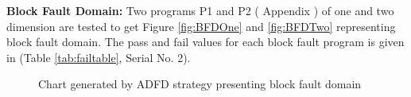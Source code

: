 \documentclass[runningheads,a4paper]{llncs}
\begin{document}


\textbf{Block Fault Domain:} Two programs P1 and P2 ( Appendix ) of one and two dimension are tested to get Figure \ref{fig:BFDOne} and \ref{fig:BFDTwo} representing block fault domain. The pass and fail values for each block fault program is given in (Table \ref{tab:failtable}, Serial No. 2).\\






\begin{figure} [H]



\caption{Chart generated by ADFD strategy presenting block fault domain}
\end{figure}


\end{document}
